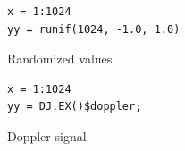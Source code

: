 \documentclass{article}
\begin{document}
\begin{figure}[h!]
\begin{lstlisting}
x = 1:1024
yy = runif(1024, -1.0, 1.0)
\end{lstlisting}
\caption{Randomized values}
\end{figure}

\begin{figure}[h!]
\begin{lstlisting}
x = 1:1024
yy = DJ.EX()$doppler;
\end{lstlisting}
\caption{Doppler signal}
\end{figure}




\end{document}

